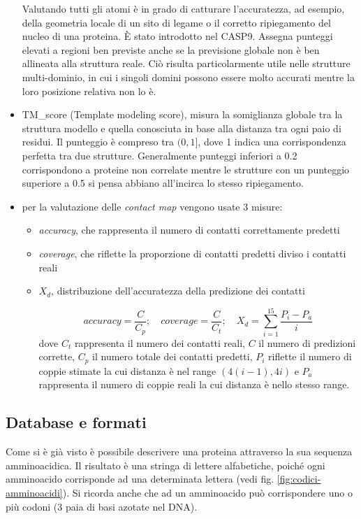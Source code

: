 \begin{itemize}
	\par Valutando tutti gli atomi è in grado di catturare l'accuratezza, ad esempio, della geometria locale di un sito di legame o il corretto ripiegamento del nucleo di una proteina. È stato introdotto nel CASP9. Assegna punteggi elevati a regioni ben previste anche se la previsione globale non è ben allineata alla struttura reale. Ciò risulta particolarmente utile nelle strutture multi-dominio, in cui i singoli domini possono essere molto accurati mentre la loro posizione relativa non lo è.
	
	\item TM\_score (Template modeling score), misura la somiglianza globale tra la struttura modello e quella conosciuta in base alla distanza tra ogni paio di residui. Il punteggio è compreso tra $(0, 1]$, dove 1 indica una corrispondenza perfetta tra due strutture. Generalmente punteggi inferiori a 0.2 corrispondono a proteine non correlate mentre le strutture con un punteggio superiore a 0.5 si pensa abbiano all'incirca lo stesso ripiegamento.\\
	
	\item per la valutazione delle \textit{contact map} vengono usate 3 misure:
	\begin{itemize}
		\item \textit{accuracy}, che rappresenta il numero di contatti correttamente predetti
		\item \textit{coverage}, che riflette la proporzione di contatti predetti diviso i contatti reali
		\item $X_{d}$, distribuzione dell'accuratezza della predizione dei contatti
		
					\[ accuracy=\frac{C}{C_{p}}; \quad coverage=\frac{C}{C_{t}}; \quad X_{d}=\sum_{i=1}^{15} \frac{P_{i}-P_{a}}{i} \]
		dove $C_{t}$ rappresenta il numero dei contatti reali, $C$ il numero di predizioni corrette, $C_{p}$ il numero totale dei contatti predetti, $P_{i}$ riflette il numero di coppie stimate la cui distanza è nel range $(4(i-1), 4i)$ e $P_{a}$ rappresenta il numero di coppie reali la cui distanza è nello stesso range.
	\end{itemize}
\end{itemize}


\subsection{Database e formati} \label{sec:database}

Come si è già visto è possibile descrivere una proteina attraverso la sua sequenza amminoacidica. Il risultato è una stringa di lettere alfabetiche, poiché ogni amminoacido corrisponde ad una determinata lettera (vedi fig. \ref{fig:codici-amminoacidi}). Si ricorda anche che ad un amminoacido può corrispondere uno o più codoni (3 paia di basi azotate nel DNA). \\

